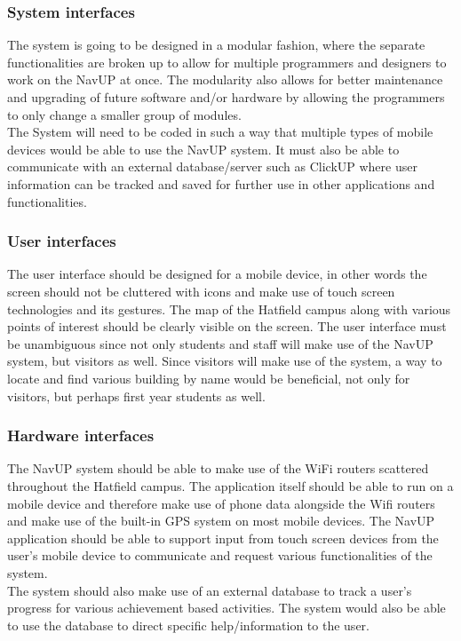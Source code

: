\documentclass[a4paper,12pt]{article}
\begin{document}
\subsubsection{System interfaces}
The system is going to be designed in a modular fashion, where the separate functionalities are broken up to allow for multiple programmers and designers to work on the NavUP at once. The modularity also allows for better maintenance and upgrading of future software and/or hardware by allowing the programmers to only change a smaller group of modules.\\
The System will need to be coded in such a way that multiple types of mobile devices would be able to use the NavUP system. It must also be able to communicate with an external database/server such as ClickUP where user information can be tracked and saved for further use in other applications and functionalities.\\
\subsubsection{User interfaces}
The user interface should be designed for a mobile device, in other words the screen should not be cluttered with icons and make use of touch screen technologies and its gestures. The map of the Hatfield campus along with various points of interest should be clearly visible on the screen. The user interface must be unambiguous since not only students and staff will make use of the NavUP system, but visitors as well. Since visitors will make use of the system, a way to locate and find various building by name would be beneficial, not only for visitors, but perhaps first year students as well.\\
\subsubsection{Hardware interfaces}
The NavUP system should be able to make use of the WiFi routers scattered throughout the Hatfield campus. The application itself should be able to run on a mobile device and therefore make use of phone data alongside the Wifi routers and make use of the built-in GPS system on most mobile devices. The NavUP application should be able to support input from touch screen devices from the user's mobile device to communicate and request various functionalities of the system.\\
The system should also make use of an external database to track a user's progress for various achievement based activities. The system would also be able to use the database to direct specific help/information to the user.\\
\end{document}
